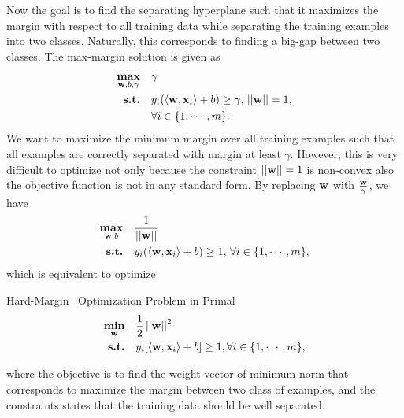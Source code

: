 Now the goal is to find the separating hyperplane such that it maximizes the margin with respect to all training data while separating the training examples into two classes.
Naturally, this corresponds to finding a big-gap between two classes.
The max-margin solution is given as \citep{Bishop07}
\begin{align*}
	\underset{\mathbf {w},b,\gamma}{\textbf{max}} &\quad \gamma\\
	\textbf{s.t.} &\quad y_i(\langle \mathbf {w}, \mathbf {x}_i \rangle+b) \ge \gamma, \, \left|\left| \mathbf {w} \right|\right|=1,\\
	 &\quad \forall i\in\{1,\cdots,m\}.
\end{align*}
We want to maximize the minimum margin over all training examples such that all examples are correctly separated with margin at least $\gamma$.
However, this is very difficult to optimize not only because the constraint $\left|\left| \mathbf {w} \right|\right|=1$ is non-convex also the objective function is not in any standard form.
By replacing $\mathbf {w}$ with $\frac{\mathbf {w}}{\gamma}$, we have 
\begin{align*}
	\underset{\mathbf {w},b}{\textbf{max}} &\quad \frac{1}{\left|\left| \mathbf {w} \right|\right|}\\
	\textbf{s.t.} &\quad y_i(\langle \mathbf {w}, \mathbf {x}_i \rangle+b) \ge 1, \, \forall i\in\{1,\cdots,m\},
\end{align*}
which is equivalent to optimize
\begin{definition}{Hard-Margin \svm\ Optimization Problem in Primal}\label{hardsvmprimal}
	\begin{align*}
		\underset{\mathbf {w}}{\textbf{min}} & \quad\frac{1}{2}\left|\left| \mathbf {w} \right|\right|^2\\
		\textbf{s.t.} & \quad y_i[\langle \mathbf {w}, \mathbf {x}_i \rangle + b] \ge 1, \forall i\in\{1,\cdots,m\},
	\end{align*}
\end{definition}
where the objective is to find the weight vector of minimum norm that corresponds to maximize the margin between two class of examples, and the constraints states that the training data should be well separated.

